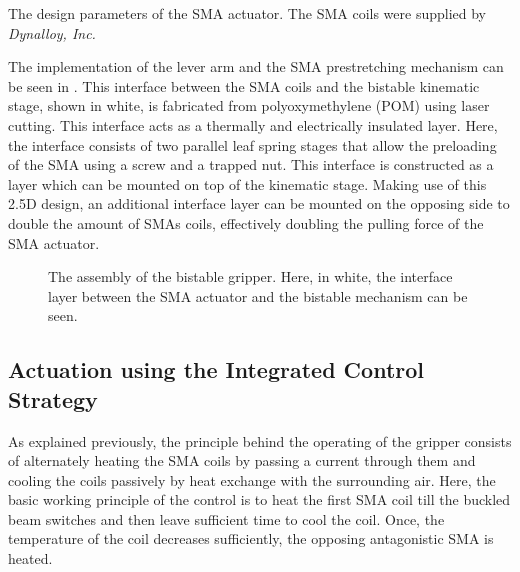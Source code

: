 \begin{table}[hbt!]
    \centering
    \caption{The design parameters of the SMA actuator. The SMA coils were supplied by \textit{Dynalloy, Inc.}}
    \label{tab:sma-design-parameters}
    
\end{table}

The implementation of the lever arm and the SMA prestretching mechanism can be seen in \todocite. This interface between the SMA coils and the bistable kinematic stage, shown in white, is fabricated from polyoxymethylene (POM) using laser cutting. This interface acts as a thermally and electrically insulated layer. Here, the interface consists of two parallel leaf spring stages that allow the preloading of the SMA using a screw and a trapped nut. This interface is constructed as a layer which can be mounted on top of the kinematic stage. Making use of this 2.5D design, an additional interface layer can be mounted on the opposing side to double the amount of SMAs coils, effectively doubling the pulling force of the SMA actuator.

\begin{figure}[hbt!] %
  \centering
  
  \caption{The assembly of the bistable gripper. Here, in white, the interface layer between the SMA actuator and the bistable mechanism can be seen.}
  \label{fig:assembly-gripper}
\end{figure}

\subsection{Actuation using the Integrated Control Strategy}
As explained previously, the principle behind the operating of the gripper consists of alternately heating the SMA coils by passing a current through them and cooling the coils passively by heat exchange with the surrounding air. Here, the basic working principle of the control is to heat the first SMA coil till the buckled beam switches and then leave sufficient time to cool the coil. Once, the temperature of the coil decreases sufficiently, the opposing antagonistic SMA is heated.

